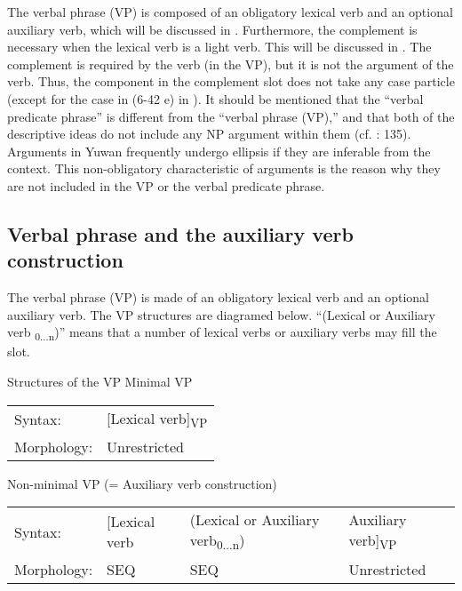 The verbal phrase (VP) is composed of an obligatory lexical verb and an optional auxiliary verb, which will be discussed in . Furthermore, the complement is necessary when the lexical verb is a light verb. This will be discussed in . The complement is required by the verb (in the VP), but it is not the argument of the verb. Thus, the component in the complement slot does not take any case particle (except for the case in (6-42 e) in ). It should be mentioned that the “verbal predicate phrase” is different from the “verbal phrase (VP),” and that both of the descriptive ideas do not include any NP argument within them (cf. \citealt{Andrews2007}: 135). Arguments in Yuwan frequently undergo ellipsis if they are inferable from the context. This non-obligatory characteristic of arguments is the reason why they are not included in the VP or the verbal predicate phrase.

\subsection{Verbal phrase and the auxiliary verb construction}\label{sec:9.1.1}

The verbal phrase (VP) is made of an obligatory lexical verb and an optional auxiliary verb. The VP structures are diagramed below. “(Lexical or Auxiliary verb\textsubscript{ 0...n})” means that a number of lexical verbs or auxiliary verbs may fill the slot.

\ea   Structures of the VP \label{ex:9.3}
  \ea Minimal VP\\
  \begin{tabular}{@{}ll@{}}
  Syntax: & [Lexical verb]\textsubscript{VP}\\
  Morphology: & Unrestricted\\
  \end{tabular}
  \ex Non-minimal VP (= Auxiliary verb construction)\\
  \begin{tabular}{@{}llll@{}}
  Syntax: & [Lexical verb & (Lexical or Auxiliary verb\textsubscript{0...n}) & Auxiliary verb]\textsubscript{VP}\\
  Morphology: & SEQ & SEQ & Unrestricted
  \end{tabular}
  \z
\z

